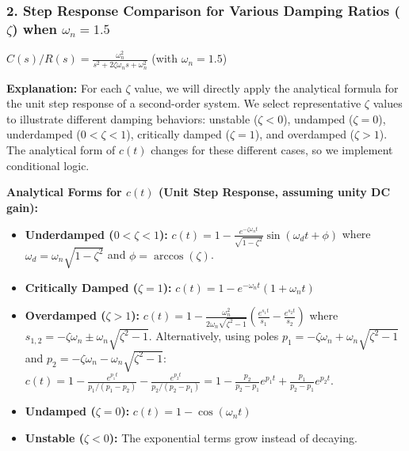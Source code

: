 \documentclass{article}
\begin{document}
	\subsubsection*{2. Step Response Comparison for Various Damping Ratios ($\zeta$) when $\omega_n = 1.5$}
	$C(s)/R(s) = \frac{\omega_n^2}{s^2 + 2\zeta\omega_n s + \omega_n^2}$ (with $\omega_n = 1.5$)
	
	\textbf{Explanation:}
	For each $\zeta$ value, we will directly apply the analytical formula for the unit step response of a second-order system.
	We select representative $\zeta$ values to illustrate different damping behaviors: unstable ($\zeta < 0$), undamped ($\zeta = 0$), underdamped ($0 < \zeta < 1$), critically damped ($\zeta = 1$), and overdamped ($\zeta > 1$). The analytical form of $c(t)$ changes for these different cases, so we implement conditional logic.
	
	\textbf{Analytical Forms for $c(t)$ (Unit Step Response, assuming unity DC gain):}
	\begin{itemize}
		\item \textbf{Underdamped ($0 < \zeta < 1$):}
		$c(t) = 1 - \frac{e^{-\zeta\omega_n t}}{\sqrt{1-\zeta^2}} \sin(\omega_d t + \phi)$ where $\omega_d = \omega_n \sqrt{1-\zeta^2}$ and $\phi = \arccos(\zeta)$.
		
		\item \textbf{Critically Damped ($\zeta = 1$):}
		$c(t) = 1 - e^{-\omega_n t} (1 + \omega_n t)$
		
		\item \textbf{Overdamped ($\zeta > 1$):}
		$c(t) = 1 - \frac{\omega_n^2}{2\omega_n\sqrt{\zeta^2-1}} \left( \frac{e^{s_1 t}}{s_1} - \frac{e^{s_2 t}}{s_2} \right)$ where $s_{1,2} = -\zeta\omega_n \pm \omega_n\sqrt{\zeta^2-1}$.
		Alternatively, using poles $p_1 = -\zeta\omega_n + \omega_n\sqrt{\zeta^2-1}$ and $p_2 = -\zeta\omega_n - \omega_n\sqrt{\zeta^2-1}$:
		$c(t) = 1 - \frac{e^{p_1 t}}{p_1/(p_1-p_2)} - \frac{e^{p_2 t}}{p_2/(p_2-p_1)} = 1 - \frac{p_2}{p_2-p_1} e^{p_1 t} + \frac{p_1}{p_2-p_1} e^{p_2 t}$.
		
		\item \textbf{Undamped ($\zeta = 0$):}
		$c(t) = 1 - \cos(\omega_n t)$
		
		\item \textbf{Unstable ($\zeta < 0$):} The exponential terms grow instead of decaying.
	\end{itemize}
	
\end{document}
